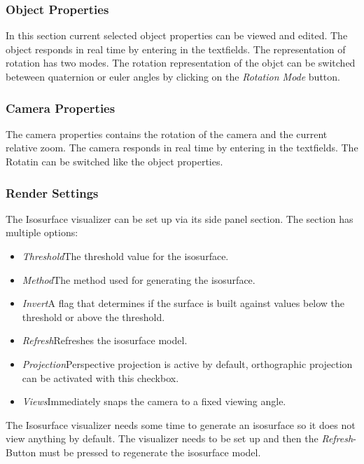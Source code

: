 \subsubsection{Object Properties}

In this section current selected object properties can be viewed and edited. The object responds in real time by entering in the textfields. The representation of rotation has two modes. The rotation representation of the objct can be switched beteween quaternion or euler angles by clicking on the \textit{Rotation Mode} button.

\subsubsection{Camera Properties}

The camera properties contains the rotation of the camera and the current relative zoom. The camera responds in real time by entering in the textfields. The Rotatin can be switched like the object properties.

\subsubsection{Render Settings}
The Isosurface visualizer can be set up via its side panel section.
The section has multiple options:
\begin{itemize}
  \item{\emph{Threshold}\newline The threshold value for the isosurface.}
  \item{\emph{Method}\newline The method used for generating the isosurface.}
  \item{\emph{Invert}\newline A flag that determines if the surface is built
    against values below the threshold or above the threshold.}
  \item{\emph{Refresh}\newline Refreshes the isosurface model.}
  \item{\emph{Projection}\newline Perspective projection is active by default, 
  orthographic projection can be activated with this checkbox.}
  \item{\emph{Views}\newline Immediately snaps the camera to a fixed viewing angle.}
\end{itemize}
The Isosurface visualizer needs some time to generate an isosurface so it does not
view anything by default.
The visualizer needs to be set up and then the \emph{Refresh}-Button must be pressed
to regenerate the isosurface model.

